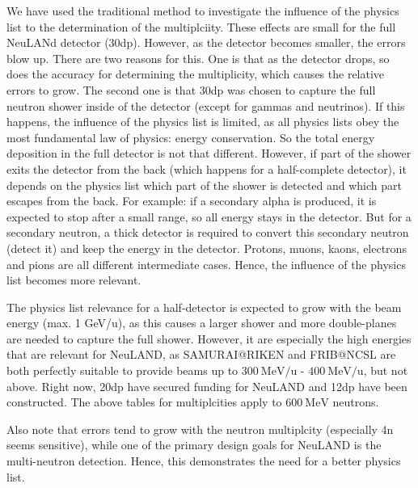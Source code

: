 \documentclass[10pt,a4paper]{report}
\newcommand{\MeV}[0]{\ \textrm{MeV}}
\newcommand{\AMeV}[0]{\ \textrm{MeV/u}}
\begin{document}
\par 
We have used the traditional method to investigate the influence of the physics list to the determination of the multiplciity. These effects are small for the full NeuLANd detector (30dp). However, as the detector becomes smaller, the errors blow up. There are two reasons for this. One is that as the detector drops, so does the accuracy for determining the multiplicity, which causes the relative errors to grow. The second one is that 30dp was chosen to capture the full neutron shower inside of the detector (except for gammas and neutrinos). If this happens, the influence of the physics list is limited, as all physics lists obey the most fundamental law of physics: energy conservation. So the total energy deposition in the full detector is not that different. However, if part of the shower exits the detector from the back (which happens for a half-complete detector), it depends on the physics list which part of the shower is detected and which part escapes from the back. For example: if a secondary alpha is produced, it is expected to stop after a small range, so all energy stays in the detector. But for a secondary neutron, a thick detector is required to convert this secondary neutron (detect it) and keep the energy in the detector. Protons, muons, kaons, electrons and pions are all different intermediate cases. Hence, the influence of the physics list becomes more relevant.

\par
The physics list relevance for a half-detector is expected to grow with the beam energy (max. 1 GeV/u), as this causes a larger shower and more double-planes are needed to capture the full shower. However, it are especially the high energies that are relevant for NeuLAND, as SAMURAI@RIKEN and FRIB@NCSL are both perfectly suitable to provide beams up to ${300 \AMeV}$ - ${400 \AMeV}$, but not above. Right now, 20dp have secured funding for NeuLAND and 12dp have been constructed. The above tables for multiplcities apply to ${600 \MeV}$ neutrons.

\par
Also note that errors tend to grow with the neutron multiplcity (especially 4n seems sensitive), while one of the primary design goals for NeuLAND is the multi-neutron detection. Hence, this demonstrates the need for a better physics list.





\end{document}
